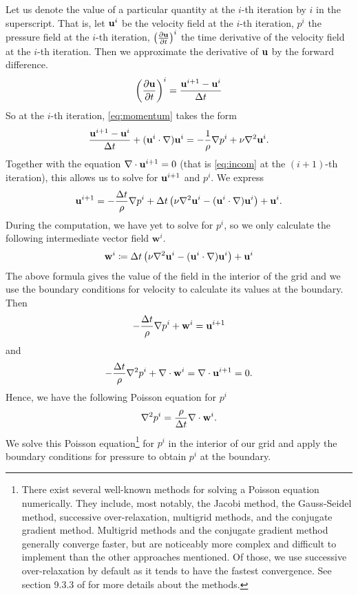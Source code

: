 \documentclass[11pt,a4paper,twoside,openright]{report}
\begin{document}
Let us denote the value of a particular quantity at the $i$-th iteration by $i$ in the superscript. That is, let $\mathbf u^i$ be the velocity field at the $i$-th iteration, $p^i$ the pressure field at the $i$-th iteration, $\left(\frac{\partial \mathbf u}{\partial t}\right)^i$ the time derivative of the velocity field at the $i$-th iteration. Then we approximate the derivative of $\mathbf u$ by the forward difference.
\begin{align*}
	\left(\frac{\partial \mathbf u}{\partial t}\right)^i=\frac{\mathbf u^{i+1}-\mathbf u^i}{\Delta t}
\end{align*}
So at the $i$-th iteration, \eqref{eq:momentum} takes the form
\begin{align*}
	\frac{\mathbf u^{i+1}-\mathbf u^i}{\Delta t}+(\mathbf u^i\cdot\nabla)\mathbf u^i=-\frac1\rho\nabla p^i+\nu\nabla^2\mathbf u^i.
\end{align*}
Together with the equation $\nabla\cdot\mathbf u^{i+1}=0$ (that is \eqref{eq:incom} at the $(i+1)$-th iteration), this allows us to solve for $\mathbf u^{i+1}$ and $p^i$. We express
\begin{align*}
	\mathbf u^{i+1}=-\frac{\Delta t}\rho\nabla p^i+\Delta t\left(\nu\nabla^2\mathbf u^i-(\mathbf u^i\cdot\nabla)\mathbf u^i\right)+\mathbf u^i.
\end{align*}
\newcommand{\ww}{\mathbf w}
During the computation, we have yet to solve for $p^i$, so we only calculate the following intermediate vector field $\ww^i$.
\begin{align*}
	\ww^i\coloneqq\dt\left(\nu\nabla^2\uu^i-(\uu^i\cdot\nabla)\uu^i\right)+\uu^i
\end{align*}
The above formula gives the value of the field in the interior of the grid and we use the boundary conditions for velocity to calculate its values at the boundary. Then
\begin{align*}
	-\frac\dt\rho\nabla p^i+\ww^i=\uu^{i+1}
\end{align*}
and
\begin{align*}
	-\frac\dt\rho\nabla^2p^i+\nabla\cdot\ww^i=\nabla\cdot\uu^{i+1}=0.
\end{align*}
Hence, we have the following Poisson equation for $p^i$
\begin{align*}
	\nabla^2p^i=\frac\rho\dt\nabla\cdot\ww^i.
\end{align*}
We solve this Poisson equation\footnote{There exist several well-known methods for solving a Poisson equation numerically. They include, most notably, the Jacobi method, the Gauss-Seidel method, successive over-relaxation, multigrid methods, and the conjugate gradient method. Multigrid methods and the conjugate gradient method generally converge faster, but are noticeably more complex and difficult to implement than the other approaches mentioned. Of those, we use successive over-relaxation by default as it tends to have the fastest convergence. See section 9.3.3 of \cite{Epperson} for more details about the methods.} for $p^i$ in the interior of our grid and apply the boundary conditions for pressure to obtain $p^i$ at the boundary.
\end{document}
